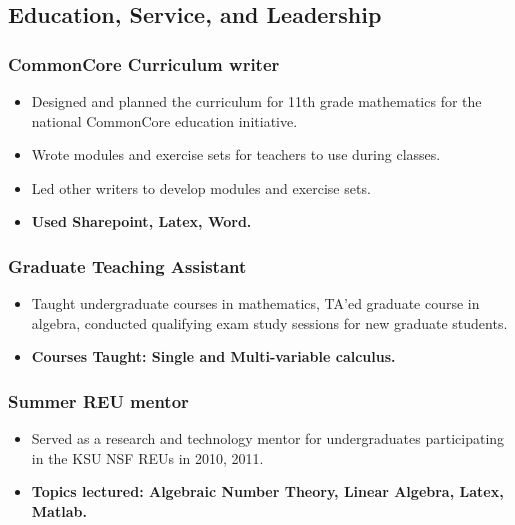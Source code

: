 \documentclass[a4paper,10pt,notitlepage]{article}
\begin{document}
\subsection*{Education, Service, and Leadership}
\subsubsection*{CommonCore Curriculum writer}
	\begin{itemize}
	\vspace{-5pt}\item 	Designed and planned the curriculum for 11th grade mathematics for the national CommonCore education initiative.
	\vspace{-5pt}\item 	Wrote modules and exercise sets for teachers to use during classes.
	\vspace{-5pt}\item 	Led other writers to develop modules and exercise sets.
	 \vspace{-5pt}\item 	\textbf{Used Sharepoint, Latex, Word.}
	\end{itemize}

\subsubsection*{Graduate Teaching Assistant}
	\begin{itemize}
	\vspace{-5pt}\item 	Taught undergraduate courses in mathematics, TA'ed graduate course in algebra, conducted qualifying exam study sessions for new graduate students.
	 \vspace{-5pt}\item 	\textbf{Courses Taught: Single and Multi-variable calculus.}
	\end{itemize}

\subsubsection*{Summer REU mentor}
	\begin{itemize}
	\vspace{-5pt}\item 	Served as a research and technology mentor for undergraduates participating in the KSU NSF REUs in 2010, 2011.
	 \vspace{-5pt}\item 	\textbf{Topics lectured: Algebraic Number Theory, Linear Algebra, Latex, Matlab.}
	\end{itemize}
\end{document}
